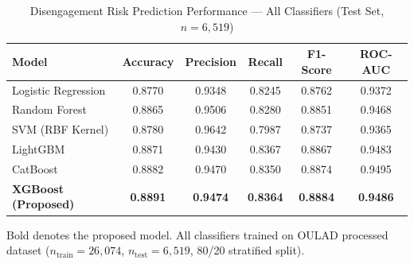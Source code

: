 \begin{table}[!t]
  \renewcommand{\arraystretch}{1.25}
  \caption{Disengagement Risk Prediction Performance — All Classifiers (Test Set, $n = 6{,}519$)}
  \label{tab:classifier_comparison}
  \centering
  \begin{tabular}{lccccc}
    \hline
    \textbf{Model} & \textbf{Accuracy} & \textbf{Precision} & \textbf{Recall} & \textbf{F1-Score} & \textbf{ROC-AUC} \\
    \hline
    Logistic Regression    & 0.8770 & 0.9348 & 0.8245 & 0.8762 & 0.9372 \\
    Random Forest          & 0.8865 & 0.9506 & 0.8280 & 0.8851 & 0.9468 \\
    SVM (RBF Kernel)       & 0.8780 & 0.9642 & 0.7987 & 0.8737 & 0.9365 \\
    LightGBM               & 0.8871 & 0.9430 & 0.8367 & 0.8867 & 0.9483 \\
    CatBoost               & 0.8882 & 0.9470 & 0.8350 & 0.8874 & 0.9495 \\
    \textbf{XGBoost (Proposed)} & \textbf{0.8891} & \textbf{0.9474} & \textbf{0.8364} & \textbf{0.8884} & \textbf{0.9486} \\
    \hline
  \end{tabular}
  \vspace{1mm}
  \begin{flushleft}
    \small Bold denotes the proposed model. All classifiers trained on OULAD processed dataset
    ($n_{\mathrm{train}} = 26{,}074$, $n_{\mathrm{test}} = 6{,}519$, 80/20 stratified split).
  \end{flushleft}
\end{table}



